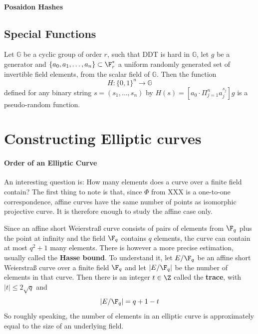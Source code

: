\paragraph{Posaidon Hashes}
\subsection{Special Functions}
\begin{theorem}
Let $\mathbb{G}$ be a cyclic group of order $r$, such that DDT is hard in $\mathbb{G}$, let $g$ be a generator and $\{a_0,a_1,\ldots,a_n\}\subset \F_{r}^*$ a uniform randomly generated set of invertible field elements, from the scalar field of $\mathbb{G}$. Then the function
$$
H: \{0,1\}^n \to \mathbb{G}
$$
defined for any binary string $s=(s_1,\ldots,s_n)$ by $H(s)= [a_0\cdot \Pi_{j=1}^n a_j^{s_j}]g$
is a pseudo-random function.
\end{theorem}

\section{Constructing Elliptic curves}
\paragraph{Order of an Elliptic Curve}
An interesting question is: How many elements does a curve over a finite field contain? The first thing to note is that, since $\Phi$ from XXX is a one-to-one correspondence, affine curves have the same number of points as isomorphic projective curve. It is therefore enough to study the affine case only.

Since an affine short Weierstraß curve consists of pairs of elements from $\F_q$ plus the point at infinity and the field $\F_q$ contains $q$ elements, the curve can contain at most $q^2+1$ many elements. There is however a more precise estimation, usually called the \textbf{Hasse bound}. To understand it, let $E/\F_q$ be an affine short Weierstraß curve over a finite field $\F_q$ and let $|E/\F_q|$ be the number of elements in that curve. Then there is an integer $t\in \Z$ called the \textbf{trace}, with $|t| \leq 2\sqrt{q}$ and
\begin{equation}
|E/\F_q| = q +1 -t
\end{equation}
So roughly speaking, the number of elements in an elliptic curve is approximately equal to the size of an underlying field.


